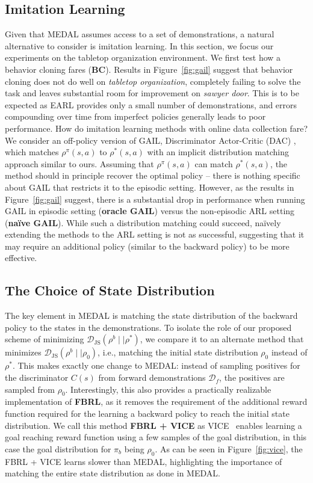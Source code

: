 \documentclass[nohyperref]{article}
\theoremstyle{plain}
\theoremstyle{definition}
\theoremstyle{remark}
\begin{document}
\subsection{Imitation Learning}
\label{sec:gail}
Given that MEDAL assumes access to a set of demonstrations, a natural alternative to consider is imitation learning. In this section, we focus our experiments on the tabletop organization environment. We first test how a behavior cloning fares (\textbf{BC}). Results in Figure~\ref{fig:gail} suggest that behavior cloning does not do well on \textit{tabletop organization}, completely failing to solve the task and leaves substantial room for improvement on \textit{sawyer door}. This is to be expected as EARL provides only a small number of demonstrations, and errors compounding over time from imperfect policies generally leads to poor performance. How do imitation learning methods with online data collection fare? We consider an off-policy version of GAIL, Discriminator Actor-Critic (DAC) \citep{kostrikov2018discriminator}, which matches $\rho^\pi(s, a)$ to $\rho^*(s, a)$ with an implicit distribution matching approach similar to ours. Assuming that $\rho^\pi(s, a)$ can match $\rho^*(s, a)$, the method should in principle recover the optimal policy -- there is nothing specific about GAIL that restricts it to the episodic setting. However, as the results in Figure~\ref{fig:gail} suggest, there is a substantial drop in performance when running GAIL in episodic setting (\textbf{oracle GAIL}) versus the non-episodic ARL setting (\textbf{na\"ive GAIL}). While such a distribution matching could succeed, na\"ively extending the methods to the ARL setting is not as successful, suggesting that it may require an additional policy (similar to the backward policy) to be more effective.


\subsection{The Choice of State Distribution}
\label{sec:init_state_ablation}
The key element in MEDAL is matching the state distribution of the backward policy to the states in the demonstrations. To isolate the role of our proposed scheme of minimizing $\mathcal{D}_{\textrm{JS}}(\rho^b \mid\mid \rho^*)$, we compare it to an alternate method that minimizes $\mathcal{D}_{\textrm{JS}} (\rho^b \mid\mid \rho_0)$, i.e., matching the initial state distribution $\rho_0$ instead of $\rho^*$. This makes exactly one change to MEDAL: instead of sampling positives for the discriminator $C(s)$ from forward demonstrations $\mathcal{D}_f$, the positives are sampled from $\rho_0$. Interestingly, this also provides a practically realizable implementation of \textbf{FBRL}, as it removes the requirement of the additional reward function required for the learning a backward policy to reach the initial state distribution.
We call this method \textbf{FBRL + VICE} as VICE~\citep{singh2019end} enables learning a goal reaching reward function using a few samples of the goal distribution, in this case the goal distribution for $\pi_b$ being $\rho_0$. As can be seen in Figure~\ref{fig:vice}, the FBRL + VICE learns slower than MEDAL, highlighting the importance of matching the entire state distribution as done in MEDAL.
\end{document}
